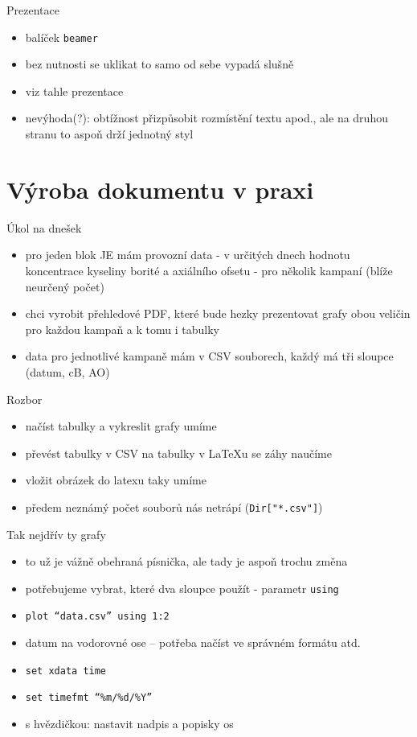 \documentclass{beamer}
\begin{document}
\begin{frame}{Prezentace}
  \begin{itemize}
    \item balíček \texttt{beamer}
    \item bez nutnosti se uklikat to samo od sebe vypadá slušně
    \item viz tahle prezentace
    \item nevýhoda(?): obtížnost přizpůsobit rozmístění textu apod., ale na druhou stranu to aspoň drží jednotný styl
  \end{itemize}
\end{frame}

\section{Výroba dokumentu v praxi}

\begin{frame}{Úkol na dnešek}
  \begin{itemize}
    \item pro jeden blok JE mám provozní data - v určitých dnech hodnotu koncentrace kyseliny borité a axiálního ofsetu - pro několik kampaní (blíže neurčený počet)
    \item chci vyrobit přehledové PDF, které bude hezky prezentovat grafy obou veličin pro každou kampaň a k tomu i tabulky
    \item data pro jednotlivé kampaně mám v CSV souborech, každý má tři sloupce (datum, cB, AO)
  \end{itemize}
\end{frame}

\begin{frame}{Rozbor}
  \begin{itemize}
    \item načíst tabulky a vykreslit grafy umíme
    \item převést tabulky v CSV na tabulky v LaTeXu se záhy naučíme
    \item vložit obrázek do latexu taky umíme
    \item předem neznámý počet souborů nás netrápí (\texttt{Dir["*.csv"]})
  \end{itemize}
\end{frame}

\begin{frame}{Tak nejdřív ty grafy}
  \begin{itemize}
    \item to už je vážně obehraná písnička, ale tady je aspoň trochu změna
    \item potřebujeme vybrat, které dva sloupce použít - parametr \texttt{using}
    \item \texttt{plot ``data.csv'' using 1:2}
    \item datum na vodorovné ose -- potřeba načíst ve správném formátu atd.
    \item \texttt{set xdata time}
    \item \texttt{set timefmt ``\%m/\%d/\%Y''}
    \item s hvězdičkou: nastavit nadpis a popisky os
  \end{itemize}
\end{frame}
\end{document}
